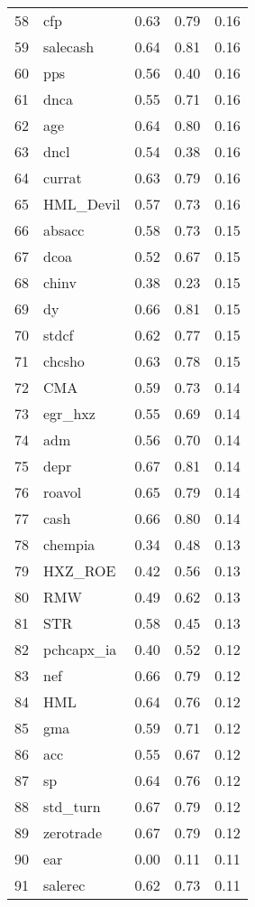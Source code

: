 \documentclass[12pt]{article}
\begin{document}
\begin{footnotesize}
\begin{longtable}{rl|c|c|c}
  58 & cfp & 0.63 & 0.79 & 0.16 \\ 
  59 & salecash & 0.64 & 0.81 & 0.16 \\ 
  60 & pps & 0.56 & 0.40 & 0.16 \\ 
  61 & dnca & 0.55 & 0.71 & 0.16 \\ 
  62 & age & 0.64 & 0.80 & 0.16 \\ 
  63 & dncl & 0.54 & 0.38 & 0.16 \\ 
  64 & currat & 0.63 & 0.79 & 0.16 \\ 
  65 & HML\_Devil & 0.57 & 0.73 & 0.16 \\ 
  66 & absacc & 0.58 & 0.73 & 0.15 \\ 
  67 & dcoa & 0.52 & 0.67 & 0.15 \\ 
  68 & chinv & 0.38 & 0.23 & 0.15 \\ 
  69 & dy & 0.66 & 0.81 & 0.15 \\ 
  70 & stdcf & 0.62 & 0.77 & 0.15 \\ 
  71 & chcsho & 0.63 & 0.78 & 0.15 \\ 
  72 & CMA & 0.59 & 0.73 & 0.14 \\ 
  73 & egr\_hxz & 0.55 & 0.69 & 0.14 \\ 
  74 & adm & 0.56 & 0.70 & 0.14 \\ 
  75 & depr & 0.67 & 0.81 & 0.14 \\ 
  76 & roavol & 0.65 & 0.79 & 0.14 \\ 
  77 & cash & 0.66 & 0.80 & 0.14 \\ 
  78 & chempia & 0.34 & 0.48 & 0.13 \\ 
  79 & HXZ\_ROE & 0.42 & 0.56 & 0.13 \\ 
  80 & RMW & 0.49 & 0.62 & 0.13 \\ 
  81 & STR & 0.58 & 0.45 & 0.13 \\ 
  82 & pchcapx\_ia & 0.40 & 0.52 & 0.12 \\ 
  83 & nef & 0.66 & 0.79 & 0.12 \\ 
  84 & HML & 0.64 & 0.76 & 0.12 \\ 
  85 & gma & 0.59 & 0.71 & 0.12 \\ 
  86 & acc & 0.55 & 0.67 & 0.12 \\ 
  87 & sp & 0.64 & 0.76 & 0.12 \\ 
  88 & std\_turn & 0.67 & 0.79 & 0.12 \\ 
  89 & zerotrade & 0.67 & 0.79 & 0.12 \\ 
  90 & ear & 0.00 & 0.11 & 0.11 \\ 
  91 & salerec & 0.62 & 0.73 & 0.11 \\ 

\end{longtable}
\end{footnotesize}
\end{document}
